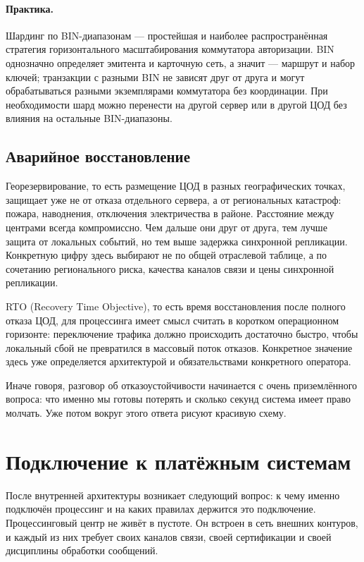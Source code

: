 \paragraph{Практика.}
  Шардинг по BIN-диапазонам — простейшая и наиболее
  распространённая стратегия горизонтального масштабирования
  коммутатора авторизации. BIN однозначно определяет эмитента
  и карточную сеть, а значит — маршрут и набор ключей;
  транзакции с разными BIN не зависят друг от друга
  и могут обрабатываться разными экземплярами коммутатора
  без координации. При необходимости шард можно перенести
  на другой сервер или в другой ЦОД без влияния на остальные
  BIN-диапазоны.


\subsection*{Аварийное восстановление}

Георезервирование, то есть размещение ЦОД в разных географических
точках, защищает уже не от отказа отдельного сервера,
а от региональных катастроф: пожара, наводнения, отключения
электричества в районе. Расстояние между центрами всегда
компромиссно. Чем дальше они друг от друга, тем лучше защита
от локальных событий, но тем выше задержка синхронной
репликации. Конкретную цифру здесь выбирают не по общей
отраслевой таблице, а по сочетанию регионального риска,
качества каналов связи и цены синхронной репликации.

RTO (Recovery Time Objective), то есть время восстановления
после полного отказа ЦОД, для процессинга имеет смысл считать
в коротком операционном горизонте: переключение трафика
должно происходить достаточно быстро, чтобы локальный сбой
не превратился в массовый поток отказов. Конкретное значение
здесь уже определяется архитектурой и обязательствами
конкретного оператора.

Иначе говоря, разговор об отказоустойчивости начинается
с очень приземлённого вопроса: что именно мы готовы потерять
и сколько секунд система имеет право молчать. Уже потом
вокруг этого ответа рисуют красивую схему.

\section{Подключение к платёжным системам}
\label{sec:pc-connectivity}

После внутренней архитектуры возникает следующий вопрос:
к чему именно подключён процессинг и на каких правилах
держится это подключение. Процессинговый центр не живёт
в пустоте. Он встроен в сеть внешних контуров, и каждый
из них требует своих каналов связи, своей сертификации
и своей дисциплины обработки сообщений.

